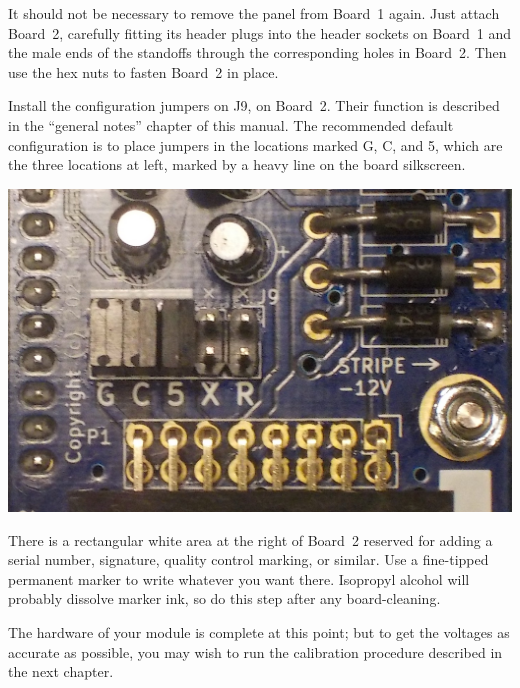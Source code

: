 It should not be necessary to remove the panel from Board~1 again.  Just
attach Board~2, carefully fitting its header
plugs into the header sockets on Board~1 and the male ends of the standoffs
through the corresponding holes in Board~2.  Then use the hex nuts to fasten
Board~2 in place.

Install the configuration jumpers on J9, on Board~2.  Their function is
described in the ``general notes'' chapter of this manual.  The recommended
default configuration is to place jumpers in the locations marked G, C, and
5, which are the three locations at left, marked by a heavy line on the
board silkscreen.

\nopagebreak\noindent
\includegraphics[width=\linewidth]{jumpers.jpg}

There is a rectangular white area at the right of Board~2 reserved for adding
a serial number, signature, quality control marking, or similar.  Use a
fine-tipped permanent marker to write whatever you want there.  Isopropyl
alcohol will probably dissolve marker ink, so do this step after any
board-cleaning.

The hardware of your module is complete at this point; but to get the
voltages as accurate as possible, you may wish to run the calibration
procedure described in the next chapter.

